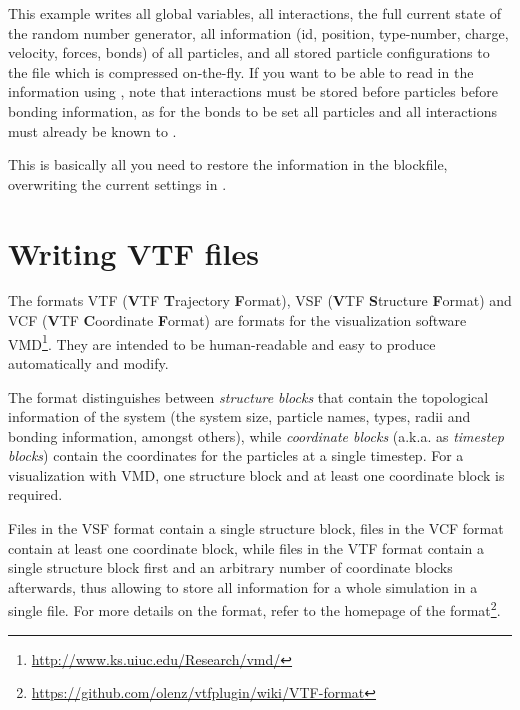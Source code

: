 This example writes all global variables, all interactions, the full
current state of the random number generator, all information (\ie id,
position, type-number, charge, velocity, forces, bonds) of all
particles, and all stored particle configurations to the file
 which is compressed on-the-fly.  If you want
to be able to read in the information using \es, note that
interactions must be stored before particles before bonding
information, as for the bonds to be set all particles and all
interactions must already be known to \es.

This is basically all you need to restore the information in the
blockfile, overwriting the current settings in \es.

\section{Writing VTF files}
\label{sec:vtf}

The formats VTF (\textbf{V}TF \textbf{T}rajectory \textbf{F}ormat),
VSF (\textbf{V}TF \textbf{S}tructure \textbf{F}ormat) and VCF
(\textbf{V}TF \textbf{C}oordinate \textbf{F}ormat) are formats for the
visualization software
VMD\cite{humphrey96a}\footnote{\url{http://www.ks.uiuc.edu/Research/vmd/}}. They
are intended to be human-readable and easy to produce automatically
and modify.

The format distinguishes between \emph{structure blocks} that contain
the topological information of the system (\ie the system size,
particle names, types, radii and bonding information, amongst others),
while \emph{coordinate blocks} (a.k.a. as \emph{timestep blocks})
contain the coordinates for the particles at a single timestep.  For a
visualization with VMD, one structure block and at least one
coordinate block is required.

Files in the VSF format contain a single structure block, files in the
VCF format contain at least one coordinate block, while files in the
VTF format contain a single structure block first and an arbitrary
number of coordinate blocks afterwards, thus allowing to store all
information for a whole simulation in a single file. For more details
on the format, refer to the homepage of the
format\footnote{\url{https://github.com/olenz/vtfplugin/wiki/VTF-format}}.

